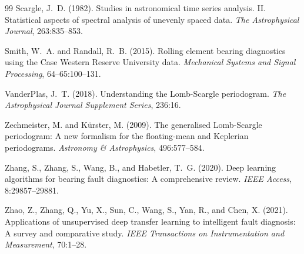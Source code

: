 \documentclass[11pt,a4paper]{article}
\begin{document}
\begin{thebibliography}{99}
Scargle, J.~D. (1982).
\newblock Studies in astronomical time series analysis. {II}. {S}tatistical aspects of spectral analysis of unevenly spaced data.
\newblock \textit{The Astrophysical Journal}, 263:835--853.

Smith, W.~A. and Randall, R.~B. (2015).
\newblock Rolling element bearing diagnostics using the {Case Western Reserve University} data.
\newblock \textit{Mechanical Systems and Signal Processing}, 64--65:100--131.

VanderPlas, J.~T. (2018).
\newblock Understanding the {Lomb-Scargle} periodogram.
\newblock \textit{The Astrophysical Journal Supplement Series}, 236:16.

Zechmeister, M. and K{\"u}rster, M. (2009).
\newblock The generalised {Lomb-Scargle} periodogram: A new formalism for the floating-mean and {Keplerian} periodograms.
\newblock \textit{Astronomy \& Astrophysics}, 496:577--584.

Zhang, S., Zhang, S., Wang, B., and Habetler, T.~G. (2020).
\newblock Deep learning algorithms for bearing fault diagnostics: A comprehensive review.
\newblock \textit{IEEE Access}, 8:29857--29881.

Zhao, Z., Zhang, Q., Yu, X., Sun, C., Wang, S., Yan, R., and Chen, X. (2021).
\newblock Applications of unsupervised deep transfer learning to intelligent fault diagnosis: A survey and comparative study.
\newblock \textit{IEEE Transactions on Instrumentation and Measurement}, 70:1--28.

\end{thebibliography}
\end{document}
